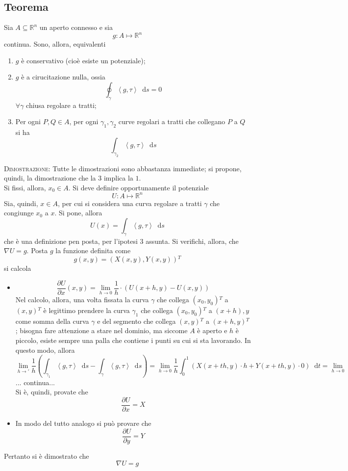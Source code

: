 \documentclass[a4paper]{extarticle}
\newcommand*\dif{\mathop{}\!\mathrm{d}}
\begin{document}
\vspace{1em}
\subsection{Teorema}
Sia $A \subseteq \mathbb{R}^n$ un aperto connesso e sia
\[g : A \longmapsto \mathbb{R}^n\]
continua. Sono, allora, equivalenti
\begin{enumerate}
    \item $g$ è conservativo (cioè esiste un potenziale);
    \item $g$ è a cirucitazione nulla, ossia
    \[\oint_\gamma \left<g,\tau\right> \dif s = 0\]
    $\forall \gamma$ chiusa regolare a tratti;
    \item Per ogni $P,Q \in A$, per ogni $\gamma_1,\gamma_2$ curve regolari a tratti che collegano $P$ a $Q$ si ha
    \[\int_{\gamma_2} \left<g,\tau\right> \dif s\]
\end{enumerate}

\vspace{2em}
\noindent
\normalfont \normalsize
\textsc{Dimostrazione}: Tutte le dimostrazioni sono abbastanza immediate; si propone, quindi, la dimostrazione che la $3$ implica la $1$.\\
Si fissi, allora, $x_0 \in A$. Si deve definire opportunamente il potenziale
\[U : A \longmapsto \mathbb{R}^n\]
Sia, quindi, $x \in A$, per cui si considera una curva regolare a tratti $\gamma$ che congiunge $x_0$ a $x$. Si pone, allora
\[U(x)=\int_\gamma \left<g,\tau\right> \dif s\]
che è una definizione pen posta, per l'ipotesi $3$ assunta. Si verifichi, allora, che $\nabla U = g$. Posta $g$ la funzione definita come
\[g(x,y) = \left(X(x,y), Y(x,y)\right){^T}\]
si calcola
\begin{itemize}
    \item \[\frac{\partial U}{\partial x}(x,y) = \lim_{h \to 0} \frac{1}{h} \cdot \left(U(x+h,y) - U(x,y)\right)\]
    Nel calcolo, allora, una volta fissata la curva $\gamma$ che collega $(x_0,y_0){^T}$ a $(x,y){^T}$ è legittimo prendere la curva $\gamma_1$ che collega $(x_0,y_0){^T}$ a $(x+h),y$ come somma della curva $\gamma$ e del segmento che collega $(x,y){^T}$ a $(x+h,y){^T}$; bisogna fare attenzione a stare nel dominio, ma siccome $A$ è aperto e $h$ è piccolo, esiste sempre una palla che contiene i punti su cui si sta lavorando. In questo modo, allora
    \[\lim_{h \to '} \dfrac{1}{h} \left(\int_{\gamma_1} \left<g,\tau\right> \dif s - \int_{\gamma} \left<g,\tau\right> \dif s\right) = \lim_{h \to 0} \frac{1}{h} \int_0^1 (X(x+th,y) \cdot h + Y (x+th,y) \cdot 0) \dif t = \lim_{h \to 0}\]
    ... continua...\\
    Si è, quindi, provate che
    \[\dfrac{\partial U}{\partial x} = X\]
    \item In modo del tutto analogo si può provare che
    \[\frac{\partial U}{\partial y} = Y\]
\end{itemize}
Pertanto si è dimostrato che
\[\nabla U = g\]
\end{document}
